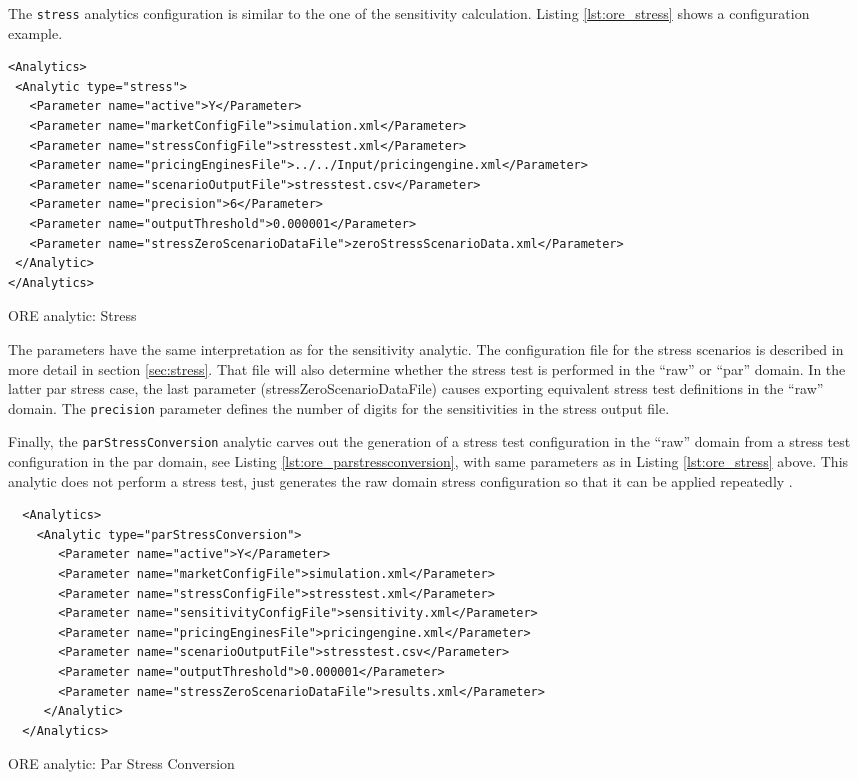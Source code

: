 {The {\tt stress} analytics configuration is similar to the one of the sensitivity calculation.
Listing \ref{lst:ore_stress} shows a configuration example.

\begin{listing}[H]
\begin{verbatim}
<Analytics>
 <Analytic type="stress">
   <Parameter name="active">Y</Parameter>
   <Parameter name="marketConfigFile">simulation.xml</Parameter>
   <Parameter name="stressConfigFile">stresstest.xml</Parameter>
   <Parameter name="pricingEnginesFile">../../Input/pricingengine.xml</Parameter>
   <Parameter name="scenarioOutputFile">stresstest.csv</Parameter>
   <Parameter name="precision">6</Parameter>
   <Parameter name="outputThreshold">0.000001</Parameter>
   <Parameter name="stressZeroScenarioDataFile">zeroStressScenarioData.xml</Parameter>
 </Analytic>
</Analytics>
\end{verbatim}
\caption{ORE analytic: Stress}
\label{lst:ore_stress}
\end{listing}

The parameters have the same interpretation as for the sensitivity analytic. The configuration file for the stress
scenarios is described in more detail in section \ref{sec:stress}. That file will also determine whether the stress test is performed in the ``raw'' or ``par'' domain. In the latter par stress case, the last parameter (stressZeroScenarioDataFile) causes exporting equivalent stress test definitions in the ``raw'' domain. 
The {\tt precision} parameter defines the number of digits for the sensitivities in the stress output file. 

Finally, the {\tt parStressConversion} analytic carves out the generation of a stress test configuration in the ``raw'' domain from a stress test configuration in the par domain, see Listing
\ref{lst:ore_parstressconversion}, with same parameters as in Listing \ref{lst:ore_stress} above. This analytic does not perform a stress test, just generates the raw domain stress configuration so that it can be applied repeatedly .

\begin{listing}[H]
\begin{verbatim}
  <Analytics>
    <Analytic type="parStressConversion">
       <Parameter name="active">Y</Parameter>
       <Parameter name="marketConfigFile">simulation.xml</Parameter>
       <Parameter name="stressConfigFile">stresstest.xml</Parameter>
       <Parameter name="sensitivityConfigFile">sensitivity.xml</Parameter>
       <Parameter name="pricingEnginesFile">pricingengine.xml</Parameter>
       <Parameter name="scenarioOutputFile">stresstest.csv</Parameter>
       <Parameter name="outputThreshold">0.000001</Parameter>
       <Parameter name="stressZeroScenarioDataFile">results.xml</Parameter>
     </Analytic>
  </Analytics>
\end{verbatim}
\caption{ORE analytic: Par Stress Conversion}
\label{lst:ore_parstressconversion}
\end{listing}

}
